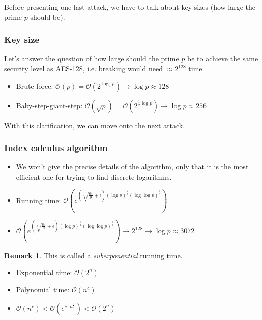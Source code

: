 \documentclass[11pt]{article}
\theoremstyle{definition}
\newtheorem{remark}{Remark}[section]
\theoremstyle{proof}
\begin{document}
Before presenting one last attack, we have to talk about key sizes (how large the prime $p$ should be).

\subsubsection{Key size}

Let's answer the question of how large should the prime $p$ be to achieve the same security level as AES-128, i.e. breaking would need $\approx 2^{128}$ time.

\begin{itemize}
	\item Brute-force: $\mathcal{O}(p) = \mathcal{O}(2^{\log_2 p}) \rightarrow \log p \approx 128$
	\item Baby-step-giant-step: $\mathcal{O}(\sqrt{p}) = \mathcal{O}(2^{\frac{1}{2}\log p}) \rightarrow \log p \approx 256$
\end{itemize}

With this clarification, we can move onto the next attack.

\subsubsection{Index calculus algorithm}

\begin{itemize}
	\item We won't give the precise details of the algorithm, only that it is the most efficient one for trying to find discrete logarithms.
	\item Running time: $\mathcal{O}(e ^{ (\sqrt[3]{\frac{64}{9}} + \epsilon) (\log p)^\frac{1}{3} (\log \log p)^\frac{2}{3}})$
	\item $\mathcal{O}(e ^{ (\sqrt[3]{\frac{64}{9}} + \epsilon) (\log p)^\frac{1}{3} (\log \log p)^\frac{2}{3}}) \rightarrow 2^{128} \rightarrow \log p \approx 3072$ 
\end{itemize}

\begin{remark}
	This is called a \emph{subexponential} running time.
	\begin{itemize}
		\item Exponential time: $\mathcal{O}(2^n)$
		\item Polynomial time: $\mathcal{O}(n^c)$
		\item $\mathcal{O}(n^c) < \mathcal{O}(e^{c \cdot n^{\frac{1}{3}}}) < \mathcal{O}(2^n)$
	\end{itemize}
\end{remark}
\end{document}
